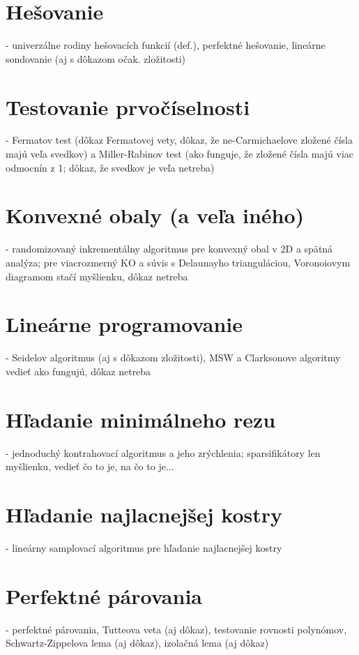 \documentclass[12pt,a4paper]{article}
\begin{document}
\section{Hešovanie}
 - univerzálne rodiny hešovacích funkcií (def.), perfektné hešovanie, lineárne sondovanie (aj s dôkazom očak. zložitosti)
 

\section{Testovanie prvočíselnosti}
 - Fermatov test (dôkaz Fermatovej vety, dôkaz, že ne-Carmichaelove zložené čísla majú veľa svedkov) a Miller-Rabinov test (ako funguje, že zložené čísla majú viac odmocnín z 1; dôkaz, že svedkov je veľa netreba)
 

\section{Konvexné obaly (a veľa iného)}
 - randomizovaný inkrementálny algoritmus pre konvexný obal v 2D a spätná analýza; pre viacrozmerný KO a súvis s Delaunayho trianguláciou, Voronoiovym diagramom stačí myšlienku, dôkaz netreba
 

\section{Lineárne programovanie}
 - Seidelov algoritmus (aj s dôkazom zložitosti), MSW a Clarksonove algoritmy vedieť ako fungujú, dôkaz netreba
 

\section{Hľadanie minimálneho rezu}
 - jednoduchý kontrahovací algoritmus a jeho zrýchlenia; sparsifikátory len myšlienku, vedieť čo to je, na čo to je...
 

\section{Hľadanie najlacnejšej kostry}
 - lineárny samplovací algoritmus pre hľadanie najlacnejšej kostry
 

\section{Perfektné párovania}
 - perfektné párovania, Tutteova veta (aj dôkaz), testovanie rovnosti polynómov, Schwartz-Zippelova lema (aj dôkaz), izolačná lema (aj dôkaz)
 
\end{document}
